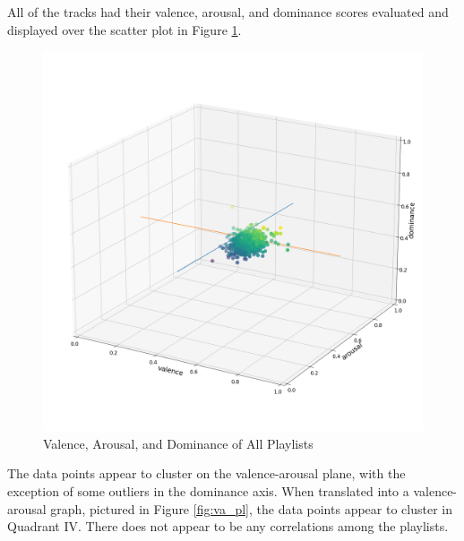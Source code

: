 \documentclass[11pt]{article}
\begin{document}
All of the tracks had their valence, arousal, and dominance scores evaluated and displayed over the scatter plot in Figure \ref{fig:vad_pl}.

\begin{figure}[!ht]
  \includegraphics[scale=0.3]{../statics/plots/vad.png}
  \centering
  \caption{Valence, Arousal, and Dominance of All Playlists}
  \label{fig:vad_pl}
\end{figure}
The data points appear to cluster on the valence-arousal plane, with the exception of some outliers in the dominance axis. When translated into a valence-arousal graph, pictured in Figure \ref{fig:va_pl}, the data points appear to cluster in Quadrant IV. There does not appear to be any correlations among the playlists.
\end{document}
